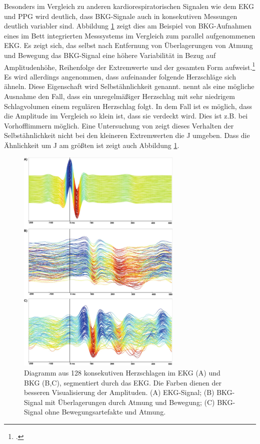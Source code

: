 	
	Besonders im Vergleich zu anderen kardiorespiratorischen Signalen wie dem \ac{EKG} und \ac{PPG} wird deutlich, dass \ac{BKG}-Signale auch in konsekutiven Messungen deutlich variabler sind. Abbildung \ref{fig:variabilitaet} zeigt dies am Beispiel von \ac{BKG}-Aufnahmen eines im Bett integrierten Messsystems im Vergleich zum parallel aufgenommenen \ac{EKG}. Es zeigt sich, das selbst nach Entfernung von Überlagerungen von Atmung  und Bewegung das \ac{BKG}-Signal eine höhere Variabilität in Bezug auf Amplitudenhöhe, Reihenfolge der Extremwerte und der gesamten Form aufweist.\footcite[Vgl.][]{Zink2017} Es wird allerdings angenommen, dass aufeinander folgende Herzschläge sich ähneln. Diese Eigenschaft wird Selbstähnlichkeit genannt. \citeauthor{Bruser2013} nennt als eine mögliche Ausnahme den Fall, dass ein unregelmäßiger Herzschlag mit sehr niedrigem Schlagvolumen einem regulären Herzschlag folgt. In dem Fall ist es möglich, dass die Amplitude im Vergleich so klein ist, dass sie verdeckt wird. Dies ist z.B. bei Vorhofflimmern möglich. Eine Untersuchung von \citeauthor{Rosales2012} zeigt dieses Verhalten der Selbstähnlichkeit nicht bei den kleineren Extremwerten die J umgeben. Dass die Ähnlichkeit um J am größten ist zeigt auch Abbildung \ref{fig:variabilitaet}.
	
	\begin{figure}[H]
		\centering
		\includegraphics[width=0.7\textwidth]{pic/Variabilitaet.jpg}
		\caption[Visualisierung der Variabilität des \ac{BKG}-Signals]{Diagramm aus 128 konsekutiven Herzschlagen im EKG (A) und BKG (B,C), segmentiert durch das EKG. Die Farben dienen der besseren Visualisierung der Amplituden. (A) EKG-Signal; (B) BKG-Signal mit Überlagerungen durch Atmung und Bewegung; (C) \ac{BKG}-Signal ohne Bewegungsartefakte und Atmung.\protect\footnotemark}
		\label{fig:variabilitaet}
	\end{figure}
	
